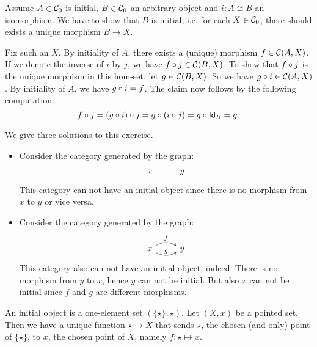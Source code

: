 \begin{solution}\label{sol:initiality_preserved_by_iso}
Assume $A\in \Ob{\CC}$ is initial, $B\in\Ob{\CC}$ an arbitrary object and $i:A\cong B$ an isomorphism. We have to show that $B$ is initial, i.e. for each $X\in\Ob{\CC}$, there should exists a unique morphism $B\to X$.

Fix such an $X$. By initiality of $A$, there exists a (unique) morphism $f\in \CHom{\CC}{A}{X}$. If we denote the inverse of $i$ by $j$, we have $\co{j}{f} \in\CHom{\CC}{B}{X}$. To show that $\co{j}{f}$ is the unique morphism in this hom-set, let $g\in \CHom{\CC}{B}{X}$. So we have $\co{i}{g} \in \CHom{\CC}{A}{X}$. By initiality of $A$, we have $\co{i}{g} = f$. The claim now follows by the following computation:
\[
\co{j}{f} = \co{j}{(\co{i}{g})} = \co{(\co{j}{i})}{g} = \co{\Id[B]}{g} = g.
\]
\end{solution}

\begin{solution}\label{sol:cat-without-initial}
We give three solutions to this exercise.
\begin{itemize}
\item Consider the category generated by the graph: 
\[
\begin{tikzcd}
x & y
\end{tikzcd}
\]
This category can not have an initial object since there is no morphism from $x$ to $y$ or vice versa.
\item Consider the category generated by the graph: 
\[
\begin{tikzcd}
x \arrow[r, bend left, "f"] \arrow[r, bend right, "g"] & y
\end{tikzcd}
\]
This category also can not have an initial object, indeed: There is no morphism from $y$ to $x$, hence $y$ can not be initial. But also $x$ can not be initial since $f$ and $g$ are different morphisms.
\end{itemize}
\end{solution}

\begin{solution}\label{sol:initial_pointset}
	An initial object is a one-element set $ (\{ \star \}, \star) $. Let $ (X, x) $ be a pointed set. Then we have a unique function $ \star \to X $ that sends $ \star $, the chosen (and only) point of $ \{ \star \} $, to $ x $, the chosen point of $ X $, namely $ f: \star \mapsto x $.
\end{solution}

